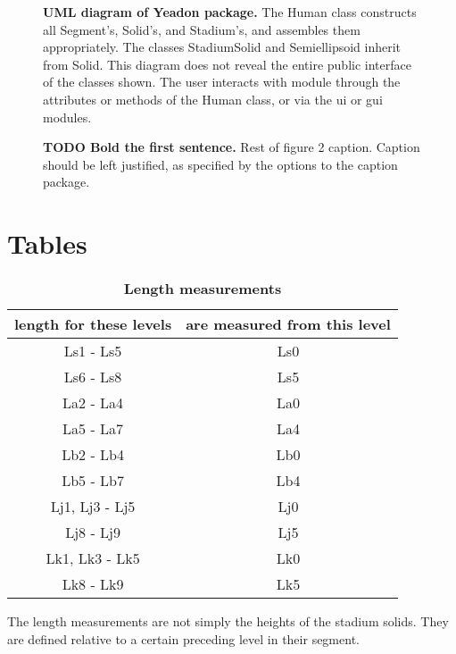 \documentclass[10pt]{article}
\begin{document}
\begin{figure}[!ht]
\begin{center}
\end{center}
\caption{
{\bf UML diagram of Yeadon package.}  The Human class constructs all
Segment's, Solid's, and Stadium's, and assembles them
appropriately. The classes StadiumSolid and Semiellipsoid inherit
from Solid. This diagram does not reveal the entire public interface of
the classes shown. The user interacts with module through the attributes or
methods of the Human class, or via the ui or gui modules.
}
\label{fig:umldiagram}
\end{figure}

\begin{figure}[!ht]
\begin{center}
\end{center}
\caption{
{\bf TODO Bold the first sentence.}  Rest of figure 2  caption.  Caption 
should be left justified, as specified by the options to the caption 
package.
}
\label{fig:femaledefault}
\end{figure}

\section*{Tables}

\begin{table}[!ht]
\caption{
\bf{Length measurements}}
\begin{tabular}{|c|c|}
    \hline
    \textbf{length for these levels} & \textbf{are measured from this level}\\
    \hline
    Ls1 - Ls5 & Ls0 \\
    \hline
    Ls6 - Ls8 & Ls5 \\
    \hline
    La2 - La4 & La0 \\
    \hline
    La5 - La7 & La4 \\
    \hline
    Lb2 - Lb4 & Lb0 \\
    \hline
    Lb5 - Lb7 & Lb4 \\
    \hline
    Lj1, Lj3 - Lj5 & Lj0 \\
    \hline
    Lj8 - Lj9 & Lj5  \\
    \hline
    Lk1, Lk3 - Lk5 & Lk0 \\
    \hline
    Lk8 - Lk9 & Lk5  \\
    \hline
\end{tabular}
\begin{flushleft}The length measurements are not simply the heights of the
    stadium solids. They are defined relative to a certain preceding level in
    their segment.
\end{flushleft}
\label{tab:length}
\end{table}
\end{document}
